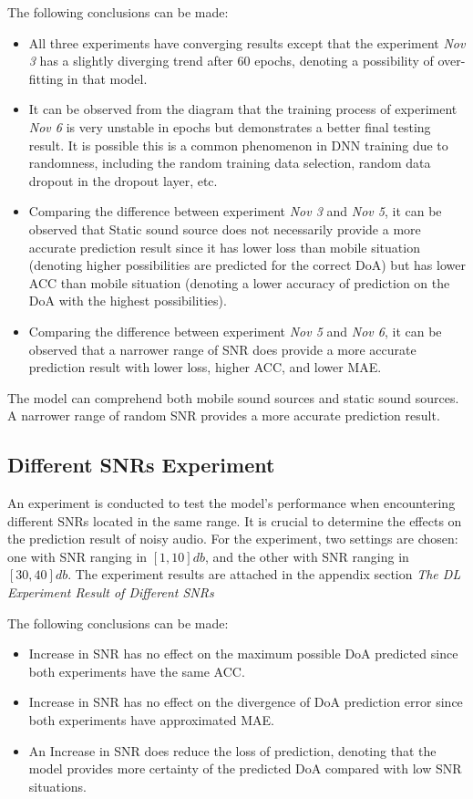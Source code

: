 The following conclusions can be made:
\begin{itemize}
    \item All three experiments have converging results except that the experiment \textit{Nov 3} has a slightly diverging trend after \(60\) epochs, denoting a possibility of over-fitting in that model. 
    \item It can be observed from the diagram that the training process of experiment \textit{Nov 6} is very unstable in epochs but demonstrates a better final testing result. It is possible this is a common phenomenon in DNN training due to randomness, including the random training data selection, random data dropout in the dropout layer, etc. 
    \item Comparing the difference between experiment \textit{Nov 3} and \textit{Nov 5}, it can be observed that Static sound source does not necessarily provide a more accurate prediction result since it has lower loss than mobile situation (denoting higher possibilities are predicted for the correct DoA) but has lower ACC than mobile situation (denoting a lower accuracy of prediction on the DoA with the highest possibilities).
    \item Comparing the difference between experiment \textit{Nov 5} and \textit{Nov 6}, it can be observed that a narrower range of SNR does provide a more accurate prediction result with lower loss, higher ACC, and lower MAE.
\end{itemize}
The model can comprehend both mobile sound sources and static sound sources. A narrower range of random SNR provides a more accurate prediction result.

\subsection*{Different SNRs Experiment}
An experiment is conducted to test the model's performance when encountering different SNRs located in the same range. It is crucial to determine the effects on the prediction result of noisy audio. For the experiment, two settings are chosen: one with SNR ranging in \([1,10]db\), and the other with SNR ranging in \([30, 40]db\). The experiment results are attached in the appendix section \textit{The DL Experiment Result of Different SNRs}

The following conclusions can be made:
\begin{itemize}
    \item Increase in SNR has no effect on the maximum possible DoA predicted since both experiments have the same ACC.
    \item Increase in SNR has no effect on the divergence of DoA prediction error since both experiments have approximated MAE.
    \item An Increase in SNR does reduce the loss of prediction, denoting that the model provides more certainty of the predicted DoA compared with low SNR situations.
\end{itemize}
